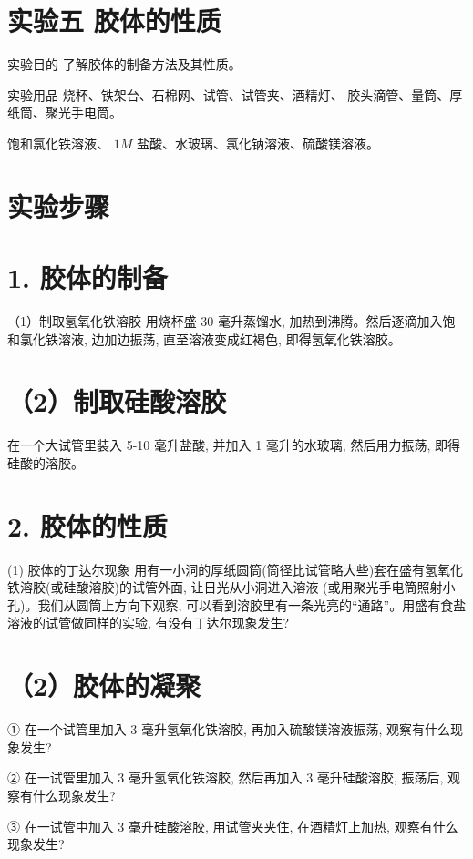 \documentclass[10pt]{article}
\begin{document}
\section*{实验五 胶体的性质}

实验目的 了解胶体的制备方法及其性质。

实验用品 烧杯、铁架台、石棉网、试管、试管夹、酒精灯、 胶头滴管、量筒、厚纸筒、聚光手电筒。

饱和氯化铁溶液、 \({1M}\) 盐酸、水玻璃、氯化钠溶液、硫酸镁溶液。

\section*{实验步骤}

\section*{1. 胶体的制备}

（1）制取氢氧化铁溶胶 用烧杯盛 30 毫升蒸馏水, 加热到沸腾。然后逐滴加入饱和氯化铁溶液, 边加边振荡, 直至溶液变成红褐色, 即得氢氧化铁溶胶。

\section*{（2）制取硅酸溶胶}

在一个大试管里装入 5-10 毫升盐酸, 并加入 1 毫升的水玻璃, 然后用力振荡, 即得硅酸的溶胶。

\section*{2. 胶体的性质}

(1) 胶体的丁达尔现象 用有一小洞的厚纸圆筒(筒径比试管略大些)套在盛有氢氧化铁溶胶(或硅酸溶胶)的试管外面, 让日光从小洞进入溶液 (或用聚光手电筒照射小孔)。我们从圆筒上方向下观察, 可以看到溶胶里有一条光亮的“通路”。用盛有食盐溶液的试管做同样的实验, 有没有丁达尔现象发生?

\section*{（2）胶体的凝聚}

① 在一个试管里加入 3 毫升氢氧化铁溶胶, 再加入硫酸镁溶液振荡, 观察有什么现象发生?

② 在一试管里加入 3 毫升氢氧化铁溶胶, 然后再加入 3 毫升硅酸溶胶, 振荡后, 观察有什么现象发生?

③ 在一试管中加入 3 毫升硅酸溶胶, 用试管夹夹住, 在酒精灯上加热, 观察有什么现象发生?
\end{document}
